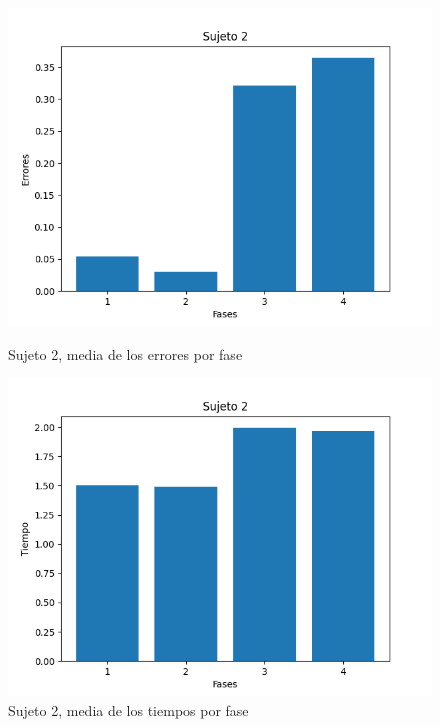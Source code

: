 \documentclass[a4paper,11pt, oneside]{book}
\begin{document}
\begin{figure}[H]
	\begin{minipage}[b]{0.5\linewidth}
		\centering
		\includegraphics[width=\linewidth]{sujeto2-errores}
		\caption{Sujeto 2, media de los errores por fase}
		\label{sujeto2-errores}
	\end{minipage}
	\hspace{0.5cm}
	\begin{minipage}[b]{0.5\linewidth}
		\centering
		\includegraphics[width=\linewidth]{sujeto2-time}
		\caption{Sujeto 2, media de los tiempos por fase}
		\label{sujeto2-time}
	\end{minipage}
\end{figure}
\end{document}

